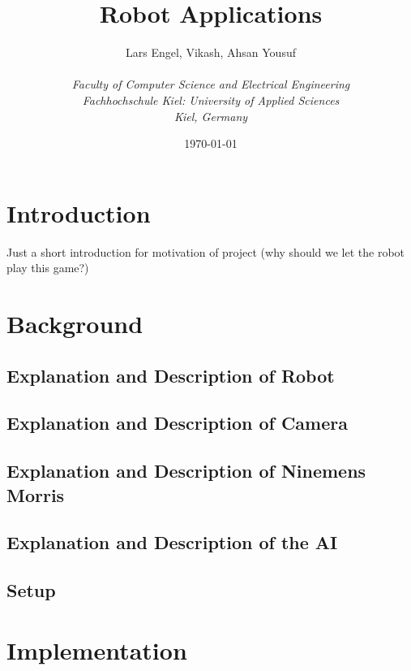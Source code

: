 \documentclass[a4paper]{spie}  %
\title{Robot Applications}
\author{Lars Engel, Vikash, Ahsan Yousuf
\\\textit{\\Faculty of Computer Science and Electrical Engineering
\\Fachhochschule Kiel: University of Applied Sciences\\ Kiel, Germany}
}
\date{\today}
\begin{document}
 
  
  \begin{LARGE}
  \maketitle
  \end{LARGE}
  \vspace{60pt}
  \begin{large}
  \tableofcontents
  \newpage



\section{Introduction}
Just a short introduction for motivation of project (why should we let the robot play this game?)
\section{Background}
\subsection{Explanation and Description of Robot}
\subsection{Explanation and Description of Camera}
\subsection{Explanation and Description of Ninemens Morris}
\subsection{Explanation and Description of the AI}
\subsection{Setup}

\newpage
\section{Implementation}

\end{large}
\end{document}
